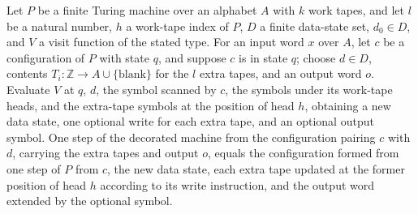 \begin{lemma}
\label{Complexity.decoratedCfg_step}
\leanok
{}
Let $P$ be a finite Turing machine over an alphabet $A$ with $k$ work tapes, and let $l$
be a natural number, $h$ a work-tape index of $P$, $D$ a finite data-state set, $d_0\in
D$, and $V$ a visit function of the stated type. For an input word $x$ over $A$, let $c$
be a configuration of $P$ with state $q$, and suppose $c$ is in state $q$; choose $d\in
D$, contents $T_i\colon\mathbb Z\to A\cup\{\text{blank}\}$ for the $l$ extra tapes, and
an output word $o$. Evaluate $V$ at $q$, $d$, the symbol scanned by $c$, the symbols
under its work-tape heads, and the extra-tape symbols at the position of head $h$,
obtaining a new data state, one optional write for each extra tape, and an optional
output symbol. One step of the decorated machine from the configuration pairing $c$ with
$d$, carrying the extra tapes and output $o$, equals the configuration formed from one
step of $P$ from $c$, the new data state, each extra tape updated at the former position
of head $h$ according to its write instruction, and the output word extended by the
optional symbol.
\end{lemma}
